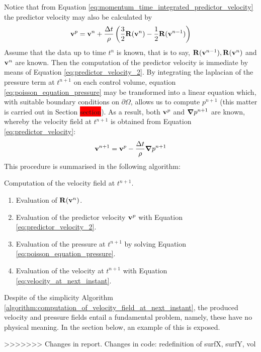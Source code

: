 Notice that from Equation \eqref{eq:momentum_time_integrated_predictor_velocity} the predictor velocity may also be calculated by
\begin{equation} \label{eq:predictor_velocity_2}
    \vb{v}^p = 
    \vb{v}^n + 
    \frac{\Delta t}{\rho} \left( \frac{3}{2} \vb{R}(\vb{v}^n) - \frac{1}{2} \vb{R}(\vb{v}^{n-1}) \right)
\end{equation}
Assume that the data up to time $t^n$ is known, that is to say, $\vb{R}(\vb{v}^{n-1}), \vb{R}(\vb{v}^n)$ and $\vb{v}^n$ are known. Then the computation of the predictor velocity is immediate by means of Equation \eqref{eq:predictor_velocity_2}. By integrating the laplacian of the pressure term at $t^{n+1}$ on each control volume, equation \eqref{eq:poisson_equation_pressure} may be transformed into a linear equation which, with suitable boundary conditions on $\partial \Omega$, allows us to compute $p^{n+1}$ (this matter is carried out in Section \colorbox{red}{section}). As a result, both $\vb{v}^p$ and $\grad{p}^{n+1}$ are known, whereby the velocity field at $t^{n+1}$ is obtained from Equation \eqref{eq:predictor_velocity}:
\begin{equation} \label{eq:velocity_at_next_instant}
    \vb{v}^{n+1} = \vb{v}^p - \frac{\Delta t}{\rho} \grad{p^{n+1}}
\end{equation} 
This procedure is summarised in the following algorithm:
\begin{algorithm}[ht]
	\caption{Computation of the velocity field at $t^{n+1}$.}
	\label{algorithm:computation_of_velocity_field_at_next_instant}
	\begin{algorithmic}[0]
		\State 
		\begin{enumerate}[label=\textbf{\arabic*},topsep=0pt]
			\item Evaluation of $\vb{R}(\vb{v}^n)$.
			\item Evaluation of the predictor velocity $\vb{v}^p$ with Equation \eqref{eq:predictor_velocity_2}.
			\item Evaluation of the pressure at $t^{n+1}$ by solving Equation \eqref{eq:poisson_equation_pressure}.
			\item Evaluation of the velocity at $t^{n+1}$ with Equation \eqref{eq:velocity_at_next_instant}.
		\end{enumerate}
	\end{algorithmic}
\end{algorithm}

Despite of the simplicity Algorithm \ref{algorithm:computation_of_velocity_field_at_next_instant}, the produced velocity and pressure fields entail a fundamental problem, namely, these have no physical meaning. In the section below, an example of this is exposed.




>>>>>>> Changes in report. Changes in code: redefinition of surfX, surfY, vol
